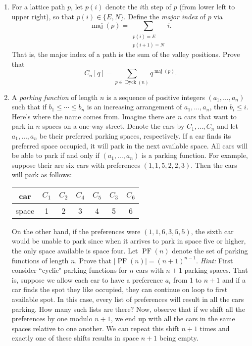 \documentclass[11pt]{article}
\theoremstyle{definition}
\DeclareMathOperator{\Dyck}{Dyck}
\DeclareMathOperator{\maj}{maj}
\DeclareMathOperator{\PF}{PF}
\begin{document}
\begin{enumerate}
\item For a lattice path $p$, let $p(i)$ denote the $i$th step of $p$ (from lower left to upper right), so that $p(i)\in\{E,N\}$. Define the \emph{major index} of $p$ via
\[
\maj(p)=\sum_{\substack{p(i)=E \\ p(i+1)=N}}i.
\]
That is, the major index of a path is the sum of the valley positions.  Prove that
\[
C_n[q]=\sum_{p\in\Dyck(n)}q^{\maj(p)}.
\]
\item A \emph{parking function} of length $n$ is a sequence of positive integers $(a_1,\ldots,a_n)$ such that if $b_1\leq \cdots \leq b_n$ is an increasing arrangement of $a_1,\ldots, a_n$, then $b_i\leq i$.  Here's where the name comes from.  Imagine there are $n$ cars that want to park in $n$ spaces on a one-way street.  Denote the cars by $C_1,\ldots, C_n$ and let $a_1,\ldots,a_n$ be their preferred parking spaces, respectively. If a car finds its preferred space occupied, it will park in the next available space.  All cars will be able to park if and only if $(a_1,\ldots,a_n)$ is a parking function.  For example, suppose their are six cars with preferences $(1,1,5,2,2,3)$.  Then the cars will park as follows:
\begin{center}
\begin{tabular}{c|cccccc}
car & $C_1$ & $C_2$ & $C_4$ & $C_5$ & $C_3$ & $C_6$\\
\hline
space & 1 & 2 & 3 & 4 & 5 & 6
\end{tabular}
\end{center}

On the other hand, if the preferences were $(1,1,6,3,5,5)$, the sixth car would be unable to park since when it arrives to park in space five or higher, the only space available is space four. Let $\PF(n)$ denote the set of parking functions of length $n$.  Prove that $|\PF(n)|=(n+1)^{n-1}$. \emph{Hint:} First consider ``cyclic" parking functions for $n$ cars with $n+1$ parking spaces.  That is, suppose we allow each car to have a preference $a_i$ from 1 to $n+1$ and if a car finds the spot they like occupied, they can continue on loop to first available spot.  In this case, every list of preferences will result in all the cars parking.  How many such lists are there?  Now, observe that if we shift all the preferences by one modulo $n+1$, we end up with all the cars in the same spaces relative to one another. We can repeat this shift $n+1$ times and exactly one of these shifts results in space $n+1$ being empty.

\end{enumerate}
\end{document}
